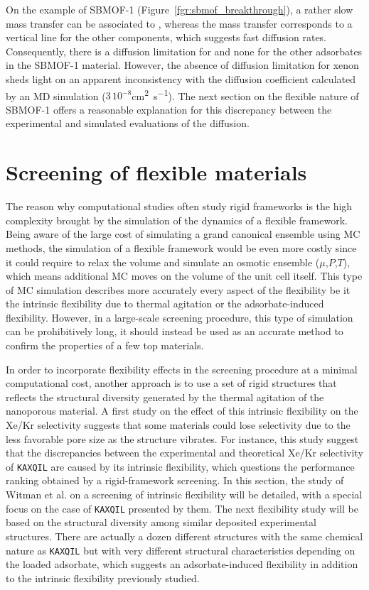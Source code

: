 \documentclass[main]{subfiles}
\begin{document}
On the example of SBMOF-1 (Figure~\ref{fgr:sbmof_breakthrough}), a rather slow mass transfer can be associated to , whereas the mass transfer corresponds to a vertical line for the other components, which suggests fast diffusion rates. Consequently, there is a diffusion limitation for  and none for the other adsorbates in the SBMOF-1 material. However, the absence of diffusion limitation for xenon sheds light on an apparent inconsistency with the diffusion coefficient calculated by an MD simulation ($3\,10^{-8}$\si{\square\cm\per\s}). The next section on the flexible nature of SBMOF-1 offers a reasonable explanation for this discrepancy between the experimental and simulated evaluations of the diffusion.

\section{Screening of flexible materials}

The reason why computational studies often study rigid frameworks is the high complexity brought by the simulation of the dynamics of a flexible framework. Being aware of the large cost of simulating a grand canonical ensemble using MC methods, the simulation of a flexible framework would be even more costly since it could require to relax the volume and simulate an osmotic ensemble ($\mu$,$P$,$T$), which means additional MC moves on the volume of the unit cell itself.\autocite{Bousquet2012} This type of MC simulation describes more accurately every aspect of the flexibility be it the intrinsic flexibility due to thermal agitation or the adsorbate-induced flexibility. However, in a large-scale screening procedure, this type of simulation can be prohibitively long, it should instead be used as an accurate method to confirm the properties of a few top materials. 

In order to incorporate flexibility effects in the screening procedure at a minimal computational cost, another approach is to use a set of rigid structures that reflects the structural diversity generated by the thermal agitation of the nanoporous material. A first study on the effect of this intrinsic flexibility on the Xe/Kr selectivity suggests that some materials could lose selectivity due to the less favorable pore size as the structure vibrates.\autocite{Witman_2017} For instance, this study suggest that the discrepancies between the experimental and theoretical Xe/Kr selectivity of \texttt{KAXQIL}\autocite{KAXQIL} are caused by its intrinsic flexibility, which questions the performance ranking obtained by a rigid-framework screening. In this section, the study of Witman et al.\autocite{Witman_2017} on a screening of intrinsic flexibility will be detailed, with a special focus on the case of \texttt{KAXQIL} presented by them. The next flexibility study will be based on the structural diversity among similar deposited experimental structures. There are actually a dozen different structures with the same chemical nature as \texttt{KAXQIL} but with very different structural characteristics depending on the loaded adsorbate, which suggests an adsorbate-induced flexibility in addition to the intrinsic flexibility previously studied. 
\end{document}
